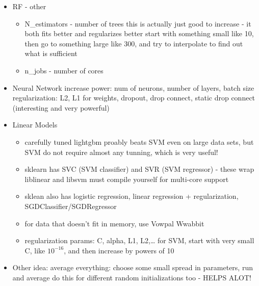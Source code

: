 \documentclass[a4paper]{report}
\begin{document}
\begin{itemize}
\begin{itemize}
  \end{itemize}
\item RF - other
  \begin{itemize}
    \item N\_estimators - number of trees 
      \subitem this is actually just good to increase - it both fits better and regularizes better
      \subitem start with something small like 10, then go to something large like 300, and try to interpolate to find out what is sufficient
    \item n\_jobs - number of cores
  \end{itemize}
\item Neural Network    
  \subitem increase power: num of neurons, number of layers, batch size
  \subitem regularization: L2, L1 for weights, dropout, drop connect, static drop connect (interesting and very powerful)
\item Linear Models
  \begin{itemize}
    \item carefully tuned lightgbm proably beats SVM even on large data sets, but SVM do not require almost any tunning, which is very useful!
    \item sklearn has SVC (SVM classifier) and SVR (SVM regressor) - these wrap liblinear and libsvm
      \subitem must compile yourself for multi-core support
    \item sklean also has logistic regression, linear regression + regularization, SGDClassifier/SGDRegressor	
    \item for data that doesn't fit in memory, use Vowpal Wwabbit
    \item regularization params: C, alpha, L1, L2,\dots
      \subitem for SVM, start with very small C, like $10^{-16}$, and then increase by powers of 10
  \end{itemize}	
\item Other idea: average everything: choose some small spread in parameters, run and average
  \subitem do this for different random initializations too - HELPS ALOT!
\end{itemize}
\end{document}
